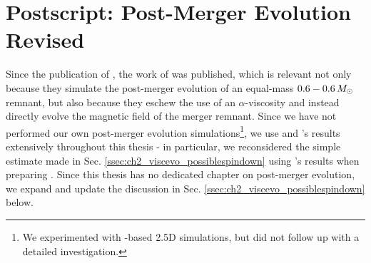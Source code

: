\section{Postscript: Post-Merger Evolution Revised}
\label{sec:postscript_pme}

Since the publication of \citeal{zhu+13}, the work of \cite{ji+13} was published, which is relevant not only because they simulate the post-merger evolution of an equal-mass $0.6-0.6\,\Msun$ remnant, but also because they eschew the use of an $\alpha$-viscosity and instead directly evolve the magnetic field of the merger remnant.  Since we have not performed our own post-merger evolution simulations\footnote{We experimented with \flash-based 2.5D simulations, but did not follow up with a detailed investigation.}, we use \cite{schw+12} and \cite{ji+13}'s results extensively throughout this thesis - in particular, we reconsidered the simple estimate made in Sec. \ref{ssec:ch2_viscevo_possiblespindown} using \cite{ji+13}'s results when preparing \citeal{zhu+16}.  Since this thesis has no dedicated chapter on post-merger evolution, we expand and update the discussion in Sec. \ref{ssec:ch2_viscevo_possiblespindown} below.


